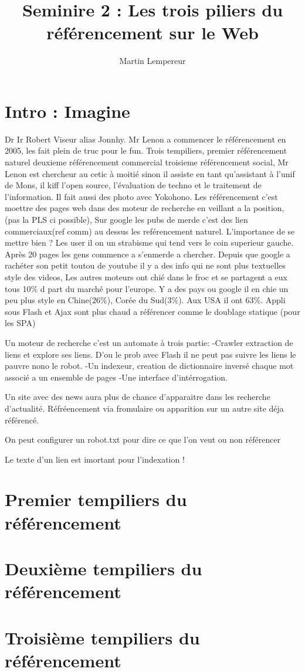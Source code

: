 \documentclass[10pt,a4paper]{article}
\title{Seminire 2 : Les trois piliers du référencement sur le Web}
\author{Martin Lempereur}
\begin{document}
\maketitle
\section{Intro : Imagine}
Dr Ir Robert Viseur alias Jonnhy.
Mr Lenon a commencer le référencement en 2005, les fait plein de truc pour le fun.
Trois tempiliers, premier référencement naturel
deuxieme référencement commercial
troisieme référencement social,
Mr Lenon est chercheur au cetic à moitié sinon il assiste en tant qu'assistant à l'unif de Mons,
il kiff l'open source, l'évaluation de techno et le traitement de l'information.
Il fait aussi des photo avec Yokohono.
Les référencement c'est moettre des pages web dans des moteur de recherche en veillant a la position, (pas la PLS ci possible), Sur google les pubs de merde c'est des lien commerciaux(ref comm) au dessus les reférencement naturel. L'importance de se mettre bien ? Les user il on un strabisme qui tend vers le coin superieur gauche. Après 20 pages les gens commence a s'enmerde a chercher.
Depuis que google a rachéter son petit toutou de youtube il y a des info qui ne sont plus textuelles style
des videos, Les autres moteurs ont chié dans le froc et se partagent a eux tous 10\% d part du marché pour l'europe.
Y a des pays ou google il en chie un peu plus style en Chine(26\%), Corée du Sud(3\%).
Aux USA il ont 63\%.
Appli sous Flash et Ajax sont plus chaud a référencer comme le doublage statique (pour les SPA)

Un moteur de recherche c'est un automate à trois partie:
-Crawler extraction de liens et explore ses liens. D'ou le prob avec Flash il ne peut pas suivre les liens le pauvre nono le robot.
-Un indexeur, creation de dictionnaire inversé chaque mot associé a un ensemble de pages
-Une interface d'intérrogation.

Un site avec des news aura plus de chance d'apparaitre dans les recherche d'actualité.
Réfréencement via fromulaire ou apparition sur un autre site déja référencé.

On peut configurer un robot.txt pour dire ce que l'on veut ou non référencer

Le texte d'un lien est imortant pour l'indexation !

\section{Premier tempiliers du référencement}
\section{Deuxième tempiliers du référencement}
\section{Troisième tempiliers du référencement}
\end{document}

